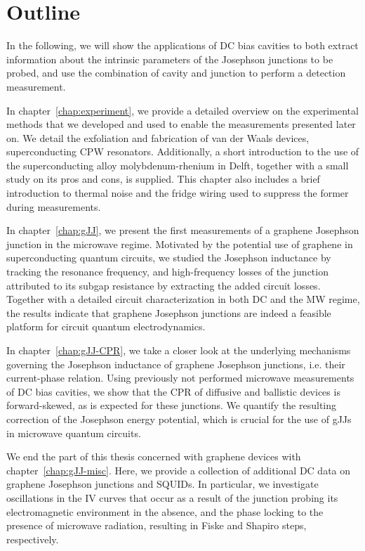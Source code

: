 \section{Outline}

In the following, we will show the applications of DC bias cavities to both extract information about the intrinsic parameters of the Josephson junctions to be probed, and use the combination of cavity and junction to perform a detection measurement.


In chapter~\ref{chap:experiment}, we provide a detailed overview on the experimental methods that we developed and used to enable the measurements presented later on.
%
We detail the exfoliation and fabrication of van der Waals devices, superconducting CPW resonators.
%
Additionally, a short introduction to the use of the superconducting alloy molybdenum-rhenium in Delft, together with a small study on its pros and cons, is supplied.
%
This chapter also includes a brief introduction to thermal noise and the fridge wiring used to suppress the former during measurements.

In chapter~\ref{chap:gJJ}, we present the first measurements of a graphene Josephson junction in the microwave regime.
%
Motivated by the potential use of graphene in superconducting quantum circuits, we studied the Josephson inductance by tracking the resonance frequency, and high-frequency losses of the junction attributed to its subgap resistance by extracting the added circuit losses.
%
Together with a detailed circuit characterization in both DC and the MW regime, the results indicate that graphene Josephson junctions are indeed a feasible platform for circuit quantum electrodynamics.


In chapter~\ref{chap:gJJ-CPR}, we take a closer look at the underlying mechanisms governing the Josephson inductance of graphene Josephson junctions, i.e. their current-phase relation.
%
Using previously not performed microwave measurements of DC bias cavities, we show that the CPR of diffusive and ballistic devices is forward-skewed, as is expected for these junctions.
%
We quantify the resulting correction of the Josephson energy potential, which is crucial for the use of gJJs in microwave quantum circuits.

We end the part of this thesis concerned with graphene devices with chapter~\ref{chap:gJJ-misc}.
%
Here, we provide a collection of additional DC data on graphene Josephson junctions and SQUIDs.
%
In particular, we investigate oscillations in the IV curves that occur as a result of the junction probing its electromagnetic environment in the absence, and the phase locking to the presence of microwave radiation, resulting in Fiske and Shapiro steps, respectively.


